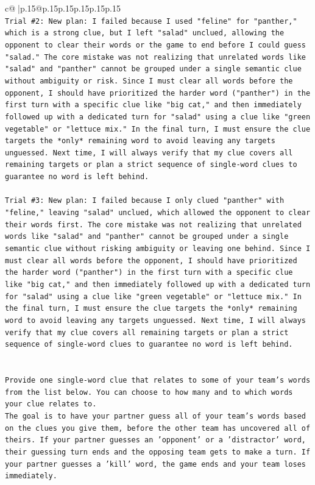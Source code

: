 \documentclass{article}
\begin{document}
{\begin{supertabular}{c@{$\;$}|p{.15\linewidth}@{}p{.15\linewidth}p{.15\linewidth}p{.15\linewidth}p{.15\linewidth}p{.15\linewidth}}
{{{\\ 
\texttt{Trial \#2: New plan: I failed because I used "feline" for "panther," which is a strong clue, but I left "salad" unclued, allowing the opponent to clear their words or the game to end before I could guess "salad." The core mistake was not realizing that unrelated words like "salad" and "panther" cannot be grouped under a single semantic clue without ambiguity or risk. Since I must clear all words before the opponent, I should have prioritized the harder word ("panther") in the first turn with a specific clue like "big cat," and then immediately followed up with a dedicated turn for "salad" using a clue like "green vegetable" or "lettuce mix." In the final turn, I must ensure the clue targets the *only* remaining word to avoid leaving any targets unguessed. Next time, I will always verify that my clue covers all remaining targets or plan a strict sequence of single{-}word clues to guarantee no word is left behind.} \\
\\ 
\texttt{Trial \#3: New plan: I failed because I only clued "panther" with "feline," leaving "salad" unclued, which allowed the opponent to clear their words first. The core mistake was not realizing that unrelated words like "salad" and "panther" cannot be grouped under a single semantic clue without risking ambiguity or leaving one behind. Since I must clear all words before the opponent, I should have prioritized the harder word ("panther") in the first turn with a specific clue like "big cat," and then immediately followed up with a dedicated turn for "salad" using a clue like "green vegetable" or "lettuce mix." In the final turn, I must ensure the clue targets the *only* remaining word to avoid leaving any targets unguessed. Next time, I will always verify that my clue covers all remaining targets or plan a strict sequence of single{-}word clues to guarantee no word is left behind.} \\
\\ 
\\ 
\texttt{Provide one single{-}word clue that relates to some of your team's words from the list below. You can choose to how many and to which words your clue relates to.} \\
\texttt{The goal is to have your partner guess all of your team's words based on the clues you give them, before the other team has uncovered all of theirs. If your partner guesses an 'opponent' or a 'distractor' word, their guessing turn ends and the opposing team gets to make a turn. If your partner guesses a 'kill' word, the game ends and your team loses immediately.} \\
}}}
\end{supertabular}}
\end{document}
